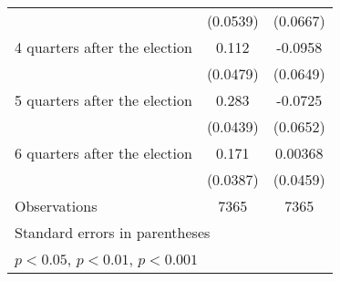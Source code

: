 \begin{table}[htbp]
\begin{tabular}{l*{2}{c}}
                    &    (0.0539)         &    (0.0667)         \\
[1em]
 4 quarters after the election&       0.112\sym{*}  &     -0.0958         \\
                    &    (0.0479)         &    (0.0649)         \\
[1em]
 5 quarters after the election&       0.283\sym{***}&     -0.0725         \\
                    &    (0.0439)         &    (0.0652)         \\
[1em]
 6 quarters after the election&       0.171\sym{***}&     0.00368         \\
                    &    (0.0387)         &    (0.0459)         \\
\hline
Observations        &        7365         &        7365         \\
\hline\hline
\multicolumn{3}{l}{\footnotesize Standard errors in parentheses}\\
\multicolumn{3}{l}{\footnotesize \sym{*} \(p<0.05\), \sym{**} \(p<0.01\), \sym{***} \(p<0.001\)}\\
\end{tabular}
\end{table}

